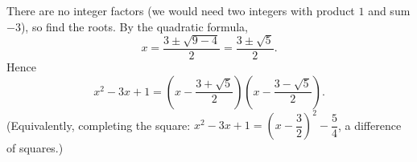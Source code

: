 There are no integer factors (we would need two integers with product $1$ and sum $-3$), so find the roots. By the quadratic formula,
\[
x=\dfrac{3\pm\sqrt{9-4}}{2}=\dfrac{3\pm\sqrt5}{2}.
\]
Hence
\[
x^2-3x+1=\boxed{\left(x-\dfrac{3+\sqrt5}{2}\right)\left(x-\dfrac{3-\sqrt5}{2}\right)}.
\]
(Equivalently, completing the square: $x^2-3x+1=\left(x-\dfrac{3}{2}\right)^2-\dfrac{5}{4}$, a difference of squares.)
